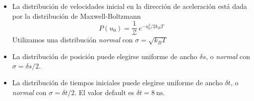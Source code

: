 \documentclass[12pt,spanish]{article}
\begin{document}
\begin{itemize}
\item La distribuci\'{o}n de velocidades inicial en la direcci\'{o}n de aceleraci\'{o}n est\'{a} dada por
  la distribuci\'{o}n de Maxwell-Boltzmann
  \begin{equation*}
    P(u_{0}) = \frac{1}{\mathcal{Z}}\, e^{-u_{0}^{2}/2k_{B}T}
  \end{equation*}
  Utilizamos una distribuci\'{o}n \emph{normal} con $\sigma = \sqrt{k_{B} T}$

\item   La distribuci\'{o}n de posici\'{o}n puede elegirse uniforme de ancho $\delta s$, o \emph{normal}
  con $\sigma= \delta s/2$.

\item   La distribuci\'{o}n de tiempos iniciales puede elegirse uniforme de ancho $\delta t$, o
  \emph{normal} con $\sigma= \delta t/2$. El valor default es $\delta t= 8~\mathrm{ns}$.

\end{itemize}
\end{document}
